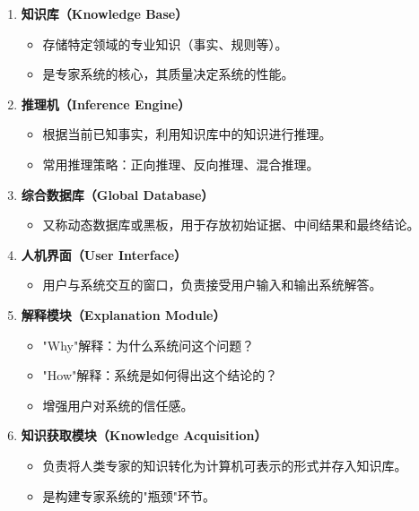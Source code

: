 \begin{enumerate}[leftmargin=2em,itemsep=0pt]
    \item \textbf{知识库（Knowledge Base）}
    \begin{itemize}
        \item 存储特定领域的专业知识（事实、规则等）。
        \item 是专家系统的核心，其质量决定系统的性能。
    \end{itemize}
    
    \item \textbf{推理机（Inference Engine）}
    \begin{itemize}
        \item 根据当前已知事实，利用知识库中的知识进行推理。
        \item 常用推理策略：正向推理、反向推理、混合推理。
    \end{itemize}
    
    \item \textbf{综合数据库（Global Database）}
    \begin{itemize}
        \item 又称动态数据库或黑板，用于存放初始证据、中间结果和最终结论。
    \end{itemize}
    
    \item \textbf{人机界面（User Interface）}
    \begin{itemize}
        \item 用户与系统交互的窗口，负责接受用户输入和输出系统解答。
    \end{itemize}
    
    \item \textbf{解释模块（Explanation Module）}
    \begin{itemize}
        \item "Why"解释：为什么系统问这个问题？
        \item "How"解释：系统是如何得出这个结论的？
        \item 增强用户对系统的信任感。
    \end{itemize}
    
    \item \textbf{知识获取模块（Knowledge Acquisition）}
    \begin{itemize}
        \item 负责将人类专家的知识转化为计算机可表示的形式并存入知识库。
        \item 是构建专家系统的"瓶颈"环节。
    \end{itemize}
\end{enumerate}

